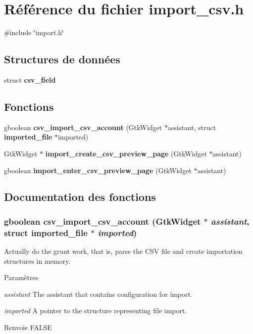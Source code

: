 \section{Référence du fichier import\_\-csv.h}
\label{import__csv_8h}
{\ttfamily \#include \char`\"{}import.h\char`\"{}}\par
\subsection*{Structures de données}
\begin{DoxyCompactItemize}
\item 
struct {\bf csv\_\-field}
\end{DoxyCompactItemize}
\subsection*{Fonctions}
\begin{DoxyCompactItemize}
\item 
gboolean {\bf csv\_\-import\_\-csv\_\-account} (GtkWidget $\ast$assistant, struct {\bf imported\_\-file} $\ast$imported)
\item 
GtkWidget $\ast$ {\bf import\_\-create\_\-csv\_\-preview\_\-page} (GtkWidget $\ast$assistant)
\item 
gboolean {\bf import\_\-enter\_\-csv\_\-preview\_\-page} (GtkWidget $\ast$assistant)
\end{DoxyCompactItemize}


\subsection{Documentation des fonctions}
\subsubsection[{csv\_\-import\_\-csv\_\-account}]{\setlength{\rightskip}{0pt plus 5cm}gboolean csv\_\-import\_\-csv\_\-account (GtkWidget $\ast$ {\em assistant}, \/  struct {\bf imported\_\-file} $\ast$ {\em imported})}\label{import__csv_8h_ae91b90112538a2ac7605b2843715e3d3}
Actually do the grunt work, that is, parse the CSV file and create importation structures in memory.


\begin{DoxyParams}{Paramètres}
\item[{\em assistant}]The assistant that contains configuration for import. \item[{\em imported}]A pointer to the structure representing file import.\end{DoxyParams}
\begin{DoxyReturn}{Renvoie}
FALSE 
\end{DoxyReturn}


